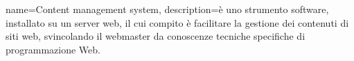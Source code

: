 {
	name={Content management system},
	description={è uno strumento software, installato su un server web, il cui
		compito è facilitare la gestione dei contenuti di siti web, svincolando il
		webmaster da conoscenze tecniche specifiche di programmazione Web.}
}


